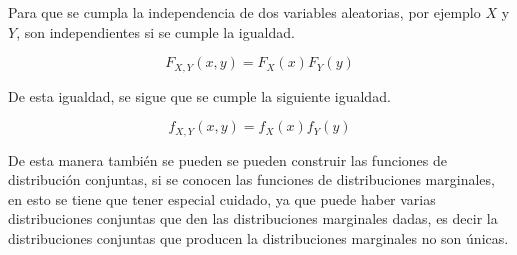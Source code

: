 Para que se cumpla la independencia de dos variables aleatorias, por ejemplo $X$ y $Y$, son independientes si se cumple la igualdad.

\begin{equation}
	F_{X,Y}(x,y) = F_X(x)F_Y(y)
\end{equation}

De esta igualdad, se sigue que se cumple la siguiente igualdad.

\begin{equation}
	f_{X,Y}(x,y) = f_X(x)f_Y(y)
\end{equation}

De esta manera también se pueden se pueden construir las funciones de distribución conjuntas, si se conocen las funciones de distribuciones marginales, en esto se tiene que tener especial cuidado, ya que puede haber varias distribuciones conjuntas que den las distribuciones marginales dadas, es decir la distribuciones conjuntas que producen la distribuciones marginales no son únicas.